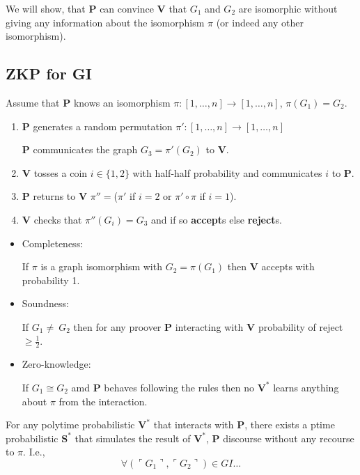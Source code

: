 \documentclass[a4paper,12pt]{article}
\theoremstyle{definition}
\theoremstyle{remark}
\begin{document}
We will show, that \textbf{P} can convince \textbf{V} that $G_1$ and $G_2$ are isomorphic without giving any information about the isomorphism
$\pi$ (or indeed any other isomorphism).

\subsection{ZKP for GI}
Assume that \textbf{P} knows an isomorphism $\pi: [1, \dots, n] \to [1, \dots, n]$, $\pi (G_1) = G_2$.

\begin{enumerate}
    \item \textbf{P} generates a random permutation $\pi': [1, \dots, n] \to [1, \dots, n]$
    
    \textbf{P} communicates the graph $G_3 = \pi'(G_2)$ to \textbf{V}.

    \item \textbf{V} tosses a coin $i \in \{1, 2\}$ with half-half probability and communicates $i$ to \textbf{P}.
    
    \item \textbf{P} returns to \textbf{V} $\pi'' = $($\pi'$ if $i = 2$ or $\pi' \circ \pi$ if $i = 1$).

    \item \textbf{V} checks that $\pi''(G_i) = G_3$ and if so \textbf{accept}s else \textbf{reject}s.
\end{enumerate}

\begin{itemize}
    \item Completeness:
    
    If $\pi$ is a graph isomorphism with $G_2 = \pi(G_1)$ then \textbf{V} accepts with probability 1.
    
    \item Soundness:
    
    If $G_1 \neq~ G_2$ then for any proover \textbf{P} interacting with \textbf{V} probability of reject $\geq \frac{1}{2}$.
    
    \item Zero-knowledge:
    
    If $G_1 \cong G_2$ amd \textbf{P} behaves following the rules then no $\textbf{V}^*$ learns anything about $\pi$ from the interaction.
\end{itemize}

For any polytime probabilistic $\textbf{V}^*$ that interacts with \textbf{P}, there exists a ptime probabilistic $\textbf{S}^*$ that simulates the result
of $\textbf{V}^*$, \textbf{P} discourse without any recourse to $\pi$. I.e.,
\begin{equation*}
    \forall (\ulcorner G_1 \urcorner, \ulcorner G_2 \urcorner) \in GI \dots
\end{equation*}
\end{document}
